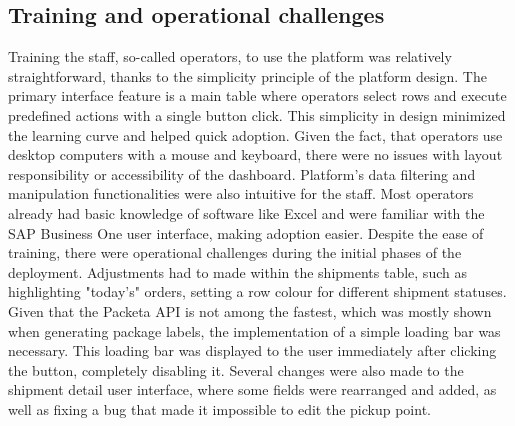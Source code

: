 \subsection{Training and operational challenges}
\label{subsec:training-operational-challenges}
Training the staff, so-called operators, to use the platform was relatively straightforward, thanks to the simplicity principle of the platform design.
The primary interface feature is a main table where operators select rows and execute predefined actions with a single button click.
This simplicity in design minimized the learning curve and helped quick adoption.
Given the fact, that operators use desktop computers with a mouse and keyboard, there were no issues with layout responsibility or accessibility of the dashboard.
Platform's data filtering and manipulation functionalities were also intuitive for the staff.
Most operators already had basic knowledge of software like Excel and were familiar with the SAP Business One user interface, making adoption easier.
Despite the ease of training, there were operational challenges during the initial phases of the deployment.
Adjustments had to made within the shipments table, such as highlighting "today's" orders, setting a row colour for different shipment statuses.
Given that the Packeta API is not among the fastest, which was mostly shown when generating package labels, the implementation of a simple loading bar was necessary.
This loading bar was displayed to the user immediately after clicking the button, completely disabling it.
Several changes were also made to the shipment detail user interface, where some fields were rearranged and added, as well as fixing a bug that made it impossible to edit the pickup point.

